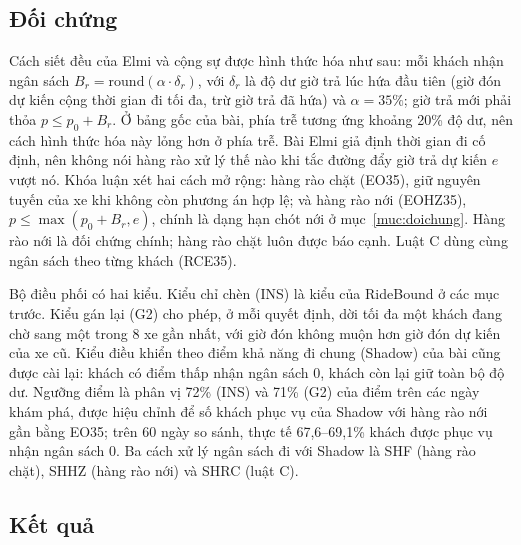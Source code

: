 \subsection{Đối chứng}
\label{muc:c4-via-doichung}

Cách siết đều của Elmi và cộng sự được hình thức hóa như sau: mỗi khách nhận ngân sách $B_r = \mathrm{round}(\alpha \cdot
\delta_r)$, với $\delta_r$ là độ dư giờ trả lúc hứa đầu tiên (giờ đón dự kiến cộng thời gian đi tối đa, trừ giờ trả đã
hứa) và $\alpha = 35\%$; giờ trả mới phải thỏa $p \le p_0 + B_r$. Ở bảng gốc của bài, phía trễ tương ứng khoảng 20\% độ
dư, nên cách hình thức hóa này lỏng hơn ở phía trễ. Bài Elmi giả định thời gian đi cố định, nên không nói hàng rào xử lý
thế nào khi tắc đường đẩy giờ trả dự kiến $e$ vượt nó. Khóa luận xét hai cách mở rộng: hàng rào chặt (EO35), giữ nguyên
tuyến của xe khi không còn phương án hợp lệ; và hàng rào nới (EOHZ35), $p \le \max(p_0 + B_r, e)$, chính là dạng hạn chót
nới ở mục~\ref{muc:doichung}. Hàng rào nới là đối chứng chính; hàng rào chặt luôn được báo cạnh. Luật C dùng cùng ngân
sách theo từng khách (RCE35).

Bộ điều phối có hai kiểu. Kiểu chỉ chèn (INS) là kiểu của RideBound ở các mục trước. Kiểu gán lại (G2) cho phép, ở mỗi
quyết định, dời tối đa một khách đang chờ sang một trong 8 xe gần nhất, với giờ đón không muộn hơn giờ đón dự kiến của xe
cũ. Kiểu điều khiển theo điểm khả năng đi chung (Shadow) của bài cũng được cài lại: khách có điểm thấp nhận ngân sách 0,
khách còn lại giữ toàn bộ độ dư. Ngưỡng điểm là phân vị 72\% (INS) và 71\% (G2) của điểm trên các ngày khám phá, được hiệu
chỉnh để số khách phục vụ của Shadow với hàng rào nới gần bằng EO35; trên 60 ngày so sánh, thực tế 67,6--69,1\% khách được
phục vụ nhận ngân sách 0. Ba cách xử lý ngân sách đi với Shadow là SHF (hàng rào chặt), SHHZ (hàng rào nới) và SHRC (luật C).

\subsection{Kết quả}
\label{muc:c4-via-ketqua}

